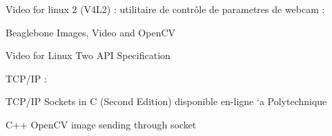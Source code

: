 Video for linux 2 (V4\+L2) \+: utilitaire de contrôle de parametres de webcam \+:
\begin{DoxyItemize}
\item Beaglebone Images, Video and Open\+CV
\item Video for Linux Two A\+PI Specification
\end{DoxyItemize}

T\+C\+P/\+IP \+:
\begin{DoxyItemize}
\item T\+C\+P/\+IP Sockets in C (Second Edition) disponible en-\/ligne `a Polytechnique
\item C++ Open\+CV image sending through socket 
\end{DoxyItemize}